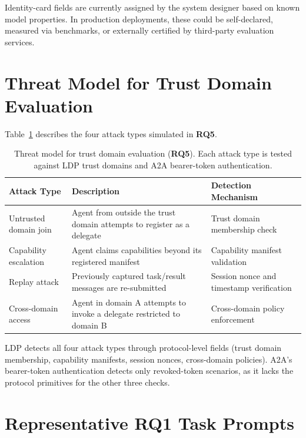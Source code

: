 \documentclass[11pt,a4paper]{article}
\newcommand{\ldp}{\textsc{LDP}}
\newcommand{\atoa}{\textsc{A2A}}
\newcommand{\RQ}[1]{\textbf{RQ#1}}
\begin{document}
\noindent Identity-card fields are currently assigned by the system designer based on known model properties. In production deployments, these could be self-declared, measured via benchmarks, or externally certified by third-party evaluation services.

\section{Threat Model for Trust Domain Evaluation}
\label{app:threat-model}

Table~\ref{tab:threat-model} describes the four attack types simulated in \RQ{5}.

\begin{table}[h]
\centering
\caption{Threat model for trust domain evaluation (\RQ{5}). Each attack type is tested against \ldp{} trust domains and \atoa{} bearer-token authentication.}
\label{tab:threat-model}
\begin{tabular}{p{2.5cm}p{4.5cm}p{3.5cm}}
\toprule
Attack Type & Description & Detection Mechanism \\
\midrule
Untrusted domain join & Agent from outside the trust domain attempts to register as a delegate & Trust domain membership check \\
\addlinespace
Capability escalation & Agent claims capabilities beyond its registered manifest & Capability manifest validation \\
\addlinespace
Replay attack & Previously captured task/result messages are re-submitted & Session nonce and timestamp verification \\
\addlinespace
Cross-domain access & Agent in domain A attempts to invoke a delegate restricted to domain B & Cross-domain policy enforcement \\
\bottomrule
\end{tabular}
\end{table}

\noindent \ldp{} detects all four attack types through protocol-level fields (trust domain membership, capability manifests, session nonces, cross-domain policies). \atoa{}'s bearer-token authentication detects only revoked-token scenarios, as it lacks the protocol primitives for the other three checks.

\section{Representative RQ1 Task Prompts}
\label{app:rq1-tasks}
\end{document}
